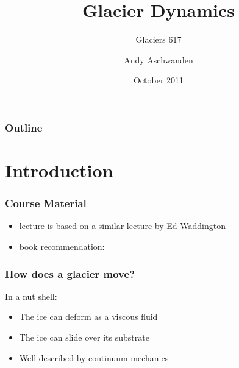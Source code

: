 \documentclass[hide notes,intlimits]{beamer}
\title[Glacier Dynamics] %
{Glacier Dynamics}
\subtitle{Glaciers 617}
\author[Aschwanden] %
{Andy Aschwanden}
\institute[ARSC] %
{
  Geophysical Institute\\
  University of Alaska Fairbanks, USA
}
\date{October 2011}
\begin{document}
\begin{frame}
  \titlepage
\end{frame}

\begin{frame}
 \frametitle{Outline}
 \tableofcontents[subsectionstyle=hide]
\end{frame}

\section{Introduction}



\begin{frame}[plain] %
  \begin{figure}
  \end{figure}
\end{frame}


\begin{frame}
  \frametitle{Course Material}
 \begin{itemize}
    \item lecture is based on a similar lecture by Ed Waddington
    \item book recommendation: \cite{GreveBlatter_disg}
 \end{itemize}
  \def\newblock{}
  
\end{frame}


 
\begin{frame}
  \frametitle{How does a glacier move?}
  \begin{block}{In a nut shell:}
    \begin{itemize}
    \item The ice can deform as a viscous fluid
    \item The ice can slide over its substrate
    \item Well-described by continuum mechanics
    \end{itemize}
  \end{block}
\end{frame}
\end{document}
